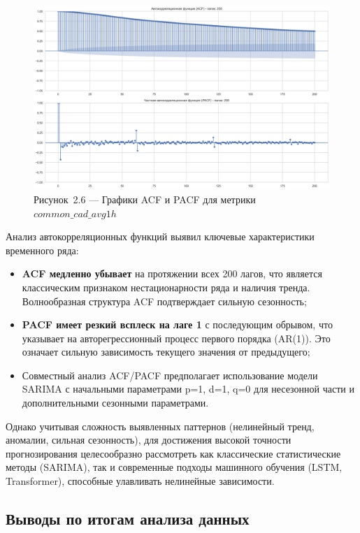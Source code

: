 \begin{figure}[H]
	\centering
	\includegraphics[width=\textwidth]{figures/chapter2/acf_pacf_plots.png}
	\caption*{Рисунок~2.6 --- Графики ACF и PACF для метрики $common\_cad\_avg1h$}
	\label{fig:acf_pacf}
\end{figure}

\hspace*{1.25cm}Анализ автокорреляционных функций выявил ключевые характеристики временного ряда:

\begin{itemize}
	\item \textbf{ACF медленно убывает} на протяжении всех 200 лагов, что является классическим признаком нестационарности ряда и наличия тренда. Волнообразная структура ACF подтверждает сильную сезонность;
	\item \textbf{PACF имеет резкий всплеск на лаге 1} с последующим обрывом, что указывает на авторегрессионный процесс первого порядка (AR(1)). Это означает сильную зависимость текущего значения от предыдущего;
	\item Совместный анализ ACF/PACF предполагает использование модели SARIMA с начальными параметрами p=1, d=1, q=0 для несезонной части и дополнительными сезонными параметрами.
\end{itemize}

\hspace*{1.25cm}Однако учитывая сложность выявленных паттернов (нелинейный тренд, аномалии, сильная сезонность), для достижения высокой точности прогнозирования целесообразно рассмотреть как классические статистические методы (SARIMA), так и современные подходы машинного обучения (LSTM, Transformer), способные улавливать нелинейные зависимости.

\subsection{Выводы по итогам анализа данных}

